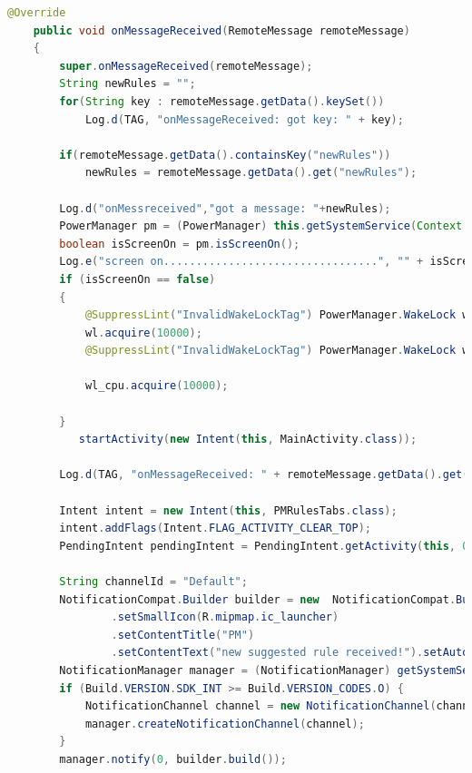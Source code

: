\begin{lstlisting}[language=Java]
    @Override
    public void onMessageReceived(RemoteMessage remoteMessage)
    {
        super.onMessageReceived(remoteMessage);
        String newRules = "";
        for(String key : remoteMessage.getData().keySet())
            Log.d(TAG, "onMessageReceived: got key: " + key);

        if(remoteMessage.getData().containsKey("newRules"))
            newRules = remoteMessage.getData().get("newRules");

        Log.d("onMessreceived","got a message: "+newRules);
        PowerManager pm = (PowerManager) this.getSystemService(Context.POWER_SERVICE);
        boolean isScreenOn = pm.isScreenOn();
        Log.e("screen on.................................", "" + isScreenOn);
        if (isScreenOn == false)
        {
            @SuppressLint("InvalidWakeLockTag") PowerManager.WakeLock wl = pm.newWakeLock(PowerManager.FULL_WAKE_LOCK | PowerManager.ACQUIRE_CAUSES_WAKEUP | PowerManager.ON_AFTER_RELEASE, "MyLock");
            wl.acquire(10000);
            @SuppressLint("InvalidWakeLockTag") PowerManager.WakeLock wl_cpu = pm.newWakeLock(PowerManager.PARTIAL_WAKE_LOCK, "MyCpuLock");

            wl_cpu.acquire(10000);

        }
           startActivity(new Intent(this, MainActivity.class));

        Log.d(TAG, "onMessageReceived: " + remoteMessage.getData().get("message") + " to: " + remoteMessage.getTo());

        Intent intent = new Intent(this, PMRulesTabs.class);
        intent.addFlags(Intent.FLAG_ACTIVITY_CLEAR_TOP);
        PendingIntent pendingIntent = PendingIntent.getActivity(this, 0, intent, PendingIntent.FLAG_ONE_SHOT);

        String channelId = "Default";
        NotificationCompat.Builder builder = new  NotificationCompat.Builder(this, channelId)
                .setSmallIcon(R.mipmap.ic_launcher)
                .setContentTitle("PM")
                .setContentText("new suggested rule received!").setAutoCancel(true).setContentIntent(pendingIntent);;
        NotificationManager manager = (NotificationManager) getSystemService(NOTIFICATION_SERVICE);
        if (Build.VERSION.SDK_INT >= Build.VERSION_CODES.O) {
            NotificationChannel channel = new NotificationChannel(channelId, "Default channel", NotificationManager.IMPORTANCE_HIGH);
            manager.createNotificationChannel(channel);
        }
        manager.notify(0, builder.build());


\end{lstlisting}
